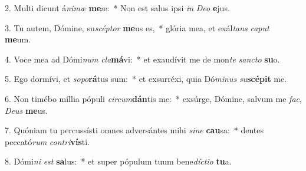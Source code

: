 2. Multi dicunt á\textit{ni}\textit{mæ} \textbf{me}æ:~*  Non est salus ipsi \textit{in} \textit{De}\textit{o} \textbf{e}jus.\

3. Tu autem, Dómine, su\textit{scép}\textit{tor} \textbf{me}us es,~*  glória mea, et exál\textit{tans} \textit{ca}\textit{put} \textbf{me}um.\

4. Voce mea ad Dómi\textit{num} \textit{cla}\textbf{má}vi:~*  et exaudívit me de mon\textit{te} \textit{sanc}\textit{to} \textbf{su}o.\

5. Ego dormívi, et \textit{so}\textit{po}\textbf{rá}tus sum:~*  et exsurréxi, quia Dó\textit{mi}\textit{nus} \textit{su}\textbf{scé}\textbf{pit} me.\

6. Non timébo míllia pópuli \textit{cir}\textit{cum}\textbf{dán}tis me:~*  exsúrge, Dómine, salvum me \textit{fac}, \textit{De}\textit{us} \textbf{me}us.\

7. Quóniam tu percussísti omnes adversántes mihi \textit{si}\textit{ne} \textbf{cau}sa:~*  dentes peccató\textit{rum} \textit{con}\textit{tri}\textbf{vís}ti.\

8. Dómi\textit{ni} \textit{est} \textbf{sa}lus:~*  et super pópulum tuum bene\textit{díc}\textit{ti}\textit{o} \textbf{tu}a.\

